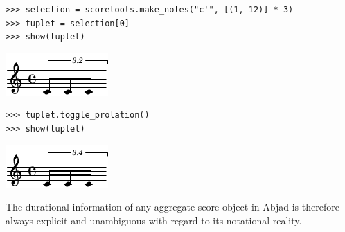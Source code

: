 \begin{lstlisting}
>>> selection = scoretools.make_notes("c'", [(1, 12)] * 3)
>>> tuplet = selection[0]
>>> show(tuplet)
\end{lstlisting}

\includegraphics[scale=1.0]{images/section_2_notational_isomorphism-4.pdf}

\begin{lstlisting}
>>> tuplet.toggle_prolation()
>>> show(tuplet)
\end{lstlisting}

\includegraphics[scale=1.0]{images/section_2_notational_isomorphism-5.pdf}


The durational information of any aggregate score object in Abjad is therefore
always explicit and unambiguous with regard to its notational reality.